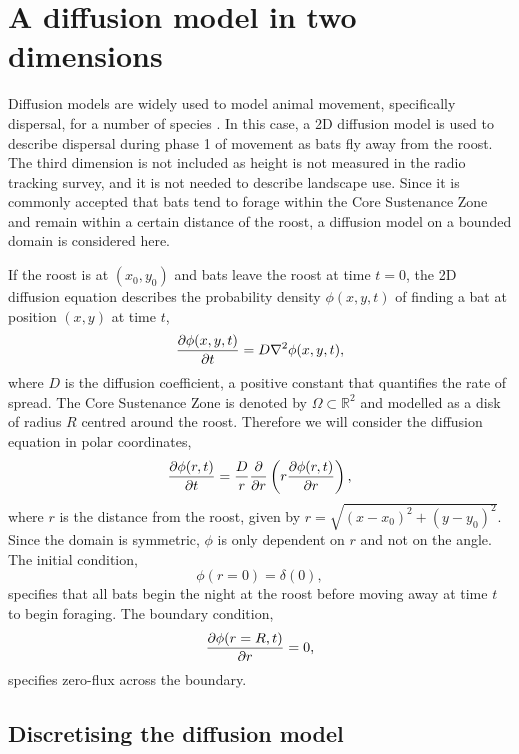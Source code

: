 \section{A diffusion model in two dimensions}


Diffusion models are widely used to model animal movement, specifically dispersal, for a number of
species \cite{Ovaskainen2016}. In this case, a 2D diffusion model is used to
describe dispersal during phase 1 of movement as bats fly away from the roost. The third dimension is not
included as height is not measured in the radio tracking survey, and it is not
needed to describe landscape use. Since it is commonly accepted that bats tend
to forage within the Core Sustenance Zone and remain within a certain distance
 of the roost, a diffusion model on a bounded domain is considered here.

If the roost is at $(x_0,y_0)$ and bats leave the roost at time $t =0$,
the 2D diffusion equation describes the probability density $\phi(x,y,t)$ of
finding a bat at position $(x,y)$ at time $t$,
%
\begin{equation}
  \frac{\partial \phi(x,y,t)}{\partial t} = D \nabla^2 \phi(x,y,t) ,
  \label{eqn:diffusion_cartesian2d}
\end{equation}
%
where $D$ is the diffusion coefficient, a positive constant that quantifies the
 rate of spread. The Core Sustenance Zone is denoted by $\Omega \subset \mathbb{R}^2$ and modelled as a disk of radius $R$ centred around the roost. Therefore we will consider the diffusion equation in polar coordinates,
 \begin{equation}
 \frac{\partial  \phi(r,t)}{\partial t} = \frac{D}{r} \frac{\partial }{\partial  r} \left( r \frac{\partial \phi(r,t)}{\partial r} \right),
 \label{eqn:diffusion_polar2d}
 \end{equation}
 where $r$ is the distance from the roost, given by $r=\sqrt{(x-x_0)^2 +
 (y-y_0)^2}$. Since the domain is symmetric, $\phi$ is only dependent on $r$ and not
  on the angle. The initial condition,
%
 \begin{equation}
 \phi(r = 0) = \delta(0),
 \label{eqn:IC2d}
 \end{equation}
%
specifies that all bats begin the night at the roost before moving away at time $t$ to begin foraging. The boundary condition,
%
\begin{equation}
\frac{\partial \phi(r=R,t)}{\partial r} = 0,
\label{eqn:BC}
\end{equation}
%
specifies zero-flux across the boundary.

\subsection{Discretising the diffusion model}

